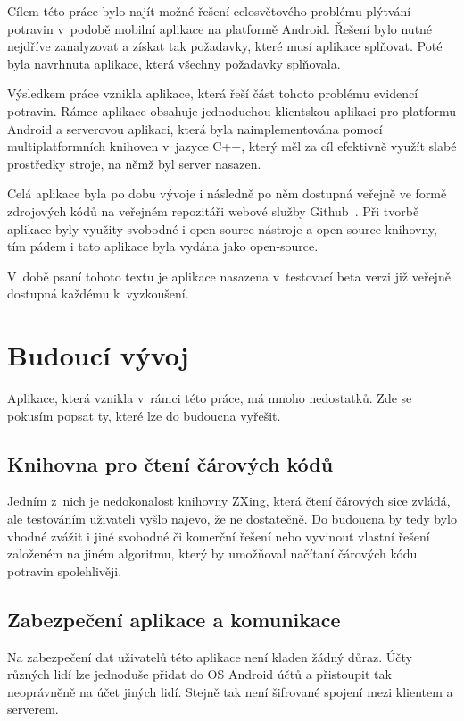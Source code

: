 \documentclass[thesis=B,czech]{FITthesis}[2013/10/20]
\begin{document}
\begin{conclusion}
Cílem této práce bylo najít možné řešení celosvětového problému plýtvání potravin v~podobě mobilní aplikace na platformě Android. Řešení bylo nutné nejdříve zanalyzovat a získat tak požadavky, které musí aplikace splňovat. Poté byla navrhnuta aplikace, která všechny požadavky splňovala.
	
Výsledkem práce vznikla aplikace, která řeší část tohoto problému evidencí potravin. Rámec aplikace obsahuje jednoduchou klientskou aplikaci pro platformu Android a serverovou aplikaci, která byla naimplementována pomocí multiplatformních knihoven v~jazyce C++, který měl za cíl efektivně využít slabé prostředky stroje, na němž byl server nasazen.

Celá aplikace byla po dobu vývoje i následně po něm dostupná veřejně ve formě zdrojových kódů na veřejném repozitáři webové služby Github~\cite{repo}. Při tvorbě aplikace byly využity svobodné i open-source nástroje a open-source knihovny, tím pádem i tato aplikace byla vydána jako open-source.

V~době psaní tohoto textu je aplikace nasazena v~testovací beta verzi již veřejně dostupná každému k~vyzkoušení.

\section{Budoucí vývoj}

Aplikace, která vznikla v~rámci této práce, má mnoho nedostatků. Zde se pokusím popsat ty, které lze do budoucna vyřešit.

\subsection{Knihovna pro čtení čárových kódů}
Jedním z~nich je nedokonalost knihovny ZXing, která čtení čárových sice zvládá, ale testováním uživateli vyšlo najevo, že ne dostatečně. Do budoucna by tedy bylo vhodné zvážit i jiné svobodné či komerční řešení nebo vyvinout vlastní řešení založeném na jiném algoritmu, který by umožňoval načítaní čárových kódu potravin spolehlivěji.

\subsection{Zabezpečení aplikace a komunikace}
Na zabezpečení dat uživatelů této aplikace není kladen žádný důraz. Účty různých lidí lze jednoduše přidat do OS Android účtů a přistoupit tak neoprávněně na účet jiných lidí. Stejně tak není šifrované spojení mezi klientem a serverem.


\end{conclusion}
\end{document}
